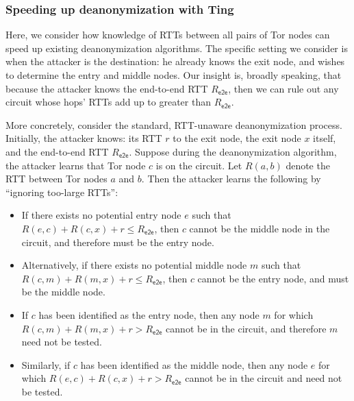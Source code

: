 
\subsubsection{Speeding up deanonymization with Ting} %

Here, we consider how knowledge of RTTs between all pairs of Tor nodes
can speed up existing deanonymization algorithms.
%
The specific setting we consider is when the attacker is the
destination: he already knows the exit node, and wishes to determine
the entry and middle nodes.
%
Our insight is, broadly speaking, that because the attacker knows the
end-to-end RTT $R_\mathsf{e2e}$, then we can rule out any circuit whose
hops' RTTs add up to greater than $R_\mathsf{e2e}$.


More concretely, consider the standard, RTT-unaware deanonymization
process.
%
Initially, the attacker knows: its RTT $r$ to the exit node, the exit
node $x$ itself, and the end-to-end RTT $R_\mathsf{e2e}$.
%
Suppose during the deanonymization algorithm, the attacker learns that
Tor node $c$ is on the circuit.
%
Let $R(a,b)$ denote the RTT between Tor nodes $a$ and $b$.
%
Then the attacker learns the following by ``ignoring too-large RTTs'':

\begin{itemize}

\item If there exists no potential entry node $e$ such that $R(e,c) +
R(c,x) + r \leq R_\mathsf{e2e}$, then $c$ cannot be the middle node in
the circuit, and therefore must be the entry node.

\item Alternatively, if there exists no potential middle node $m$ such
that $R(c,m) + R(m,x) + r \leq R_\mathsf{e2e}$, then $c$ cannot be the
entry node, and must be the middle node.

\item If $c$ has been identified as the entry node, then any node $m$
for which $R(c,m) + R(m,x) + r > R_\mathsf{e2e}$ cannot be in the
circuit, and therefore $m$ need not be tested.

\item Similarly, if $c$ has been identified as the middle node, then
any node $e$ for which $R(e,c) + R(c,x) + r > R_\mathsf{e2e}$ cannot be
in the circuit and need not be tested.

\end{itemize}


